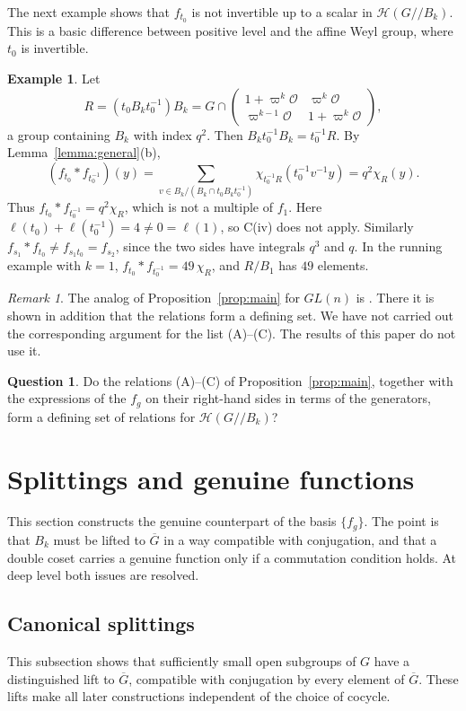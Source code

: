 \documentclass[12pt,letterpaper]{amsart}
\numberwithin{equation}{section}
\theoremstyle{definition}
\newtheorem{example}[theorem]{Example}
\newtheorem{question}[theorem]{Question}
\theoremstyle{remark}
\newtheorem{remark}[theorem]{Remark}
\newcommand{\cO}{\mathcal{O}}
\newcommand{\cH}{\mathcal{H}}
\newcommand{\Gbar}{\overline{G}}
\newcommand{\mat}[4]{\begin{pmatrix} #1 & #2\\ #3 & #4\end{pmatrix}}
\newcommand{\Hlin}{\cH(G/\!/B_k)}
\begin{document}
The next example shows that $f_{t_0}$ is not invertible up to a scalar
in $\Hlin$. This is a basic difference between positive level and the
affine Weyl group, where $t_0$ is invertible.

\begin{example}
\label{ex:t0}
Let
\[
R=(t_0B_kt_0^{-1})B_k
=G\cap\mat{1+\varpi^k\cO}{\varpi^k\cO}{\varpi^{k-1}\cO}{1+\varpi^k\cO},
\]
a group containing $B_k$ with index $q^2$. Then
$B_kt_0^{-1}B_k=t_0^{-1}R$. By Lemma~\ref{lemma:general}(b),
\[
(f_{t_0}*f_{t_0^{-1}})(y)=\sum_{v\in B_k/(B_k\cap t_0B_kt_0^{-1})}
\chi_{t_0^{-1}R}(t_0^{-1}v^{-1}y)=q^2\chi_R(y).
\]
Thus $f_{t_0}*f_{t_0^{-1}}=q^2\chi_R$, which is not a multiple of
$f_1$. Here $\ell(t_0)+\ell(t_0^{-1})=4\neq 0=\ell(1)$, so C(iv) does
not apply. Similarly $f_{s_1}*f_{t_0}\neq f_{s_1t_0}=f_{s_2}$, since the
two sides have integrals $q^3$ and $q$. In the running example with
$k=1$, $f_{t_0}*f_{t_0^{-1}}=49\,\chi_R$, and $R/B_1$ has $49$
elements.
\end{example}

\begin{remark}
The analog of Proposition~\ref{prop:main} for $GL(n)$ is
\cite[Chapter~3, Theorem~2.1]{HM85}. There it is shown in addition that
the relations form a defining set. We have not carried out the
corresponding argument for the list (A)--(C). The results of this
paper do not use it.
\end{remark}

\begin{question}
\label{q:defining}
Do the relations \textup{(A)--(C)} of Proposition~\ref{prop:main},
together with the expressions of the $f_g$ on their right-hand sides
in terms of the generators, form a defining set of relations for
$\Hlin$?
\end{question}

\section{Splittings and genuine functions}
\label{section:genuine}

This section constructs the genuine counterpart of the basis
$\{f_g\}$. The point is that $B_k$ must be lifted to $\Gbar$ in a way
compatible with conjugation, and that a double coset carries a genuine
function only if a commutation condition holds. At deep level both
issues are resolved.

\subsection{Canonical splittings}
This subsection shows that sufficiently small open subgroups of $G$
have a distinguished lift to $\Gbar$, compatible with conjugation by
every element of $\Gbar$. These lifts make all later constructions
independent of the choice of cocycle.
\end{document}
